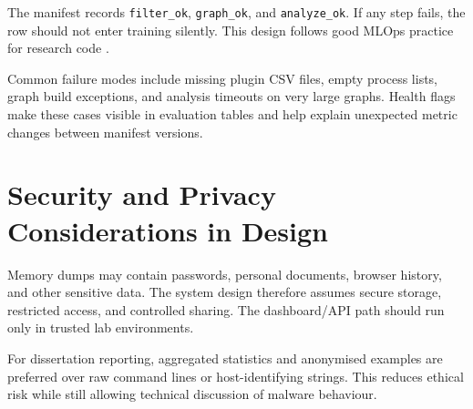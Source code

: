 The manifest records \texttt{filter\_ok}, \texttt{graph\_ok}, and \texttt{analyze\_ok}. If any step fails, the row should not enter training silently. This design follows good MLOps practice for research code \cite{sculley2015debt}.

Common failure modes include missing plugin CSV files, empty process lists, graph build exceptions, and analysis timeouts on very large graphs. Health flags make these cases visible in evaluation tables and help explain unexpected metric changes between manifest versions.

\section{Security and Privacy Considerations in Design}

Memory dumps may contain passwords, personal documents, browser history, and other sensitive data. The system design therefore assumes secure storage, restricted access, and controlled sharing. The dashboard/API path should run only in trusted lab environments.

For dissertation reporting, aggregated statistics and anonymised examples are preferred over raw command lines or host-identifying strings. This reduces ethical risk while still allowing technical discussion of malware behaviour.
